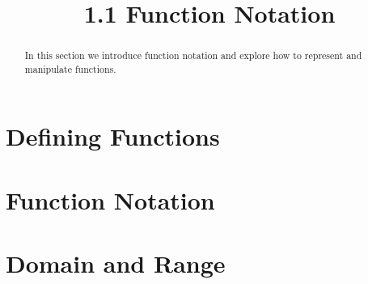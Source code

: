 \documentclass[handout]{ximera}
\title{1.1 Function Notation}
\begin{document}
\begin{abstract}
In this section we introduce function notation and explore how to represent and manipulate functions.
\end{abstract}

\maketitle


\section{Defining Functions}



\section{Function Notation}

\section{Domain and Range}
\end{document}
